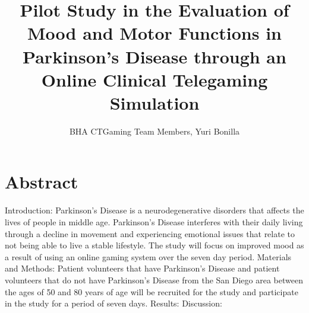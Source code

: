 \documentclass[12pt,letterpaper]{article}
\begin{document}
\title{Pilot Study in the Evaluation of Mood and Motor Functions in Parkinson's Disease through an Online Clinical Telegaming Simulation}
\author{BHA CTGaming Team Members, Yuri Bonilla}
\maketitle
 
\section{Abstract}
 Introduction: Parkinson's Disease is a neurodegenerative disorders that affects the lives of people in middle age. Parkinson's Disease interferes with their daily living through a decline in movement and experiencing emotional issues that relate to not being able to live a stable lifestyle. The study will focus on improved mood as a result of using an online gaming system over the seven day period. 
 Materials and Methods: Patient volunteers that have Parkinson's Disease and patient volunteers that do not have Parkinson's Disease from the San Diego area between the ages of 50 and 80 years of age will be recruited for the study and participate in the study for a period of seven days. 
 Results:
 Discussion:
 
\end{document}
